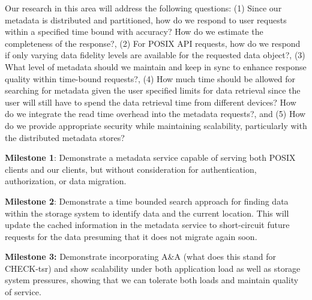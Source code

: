 Our research in this area will address the following questions:
(1) Since our metadata is distributed and partitioned, how do we respond to user
  requests within a specified time bound with accuracy? How do we estimate the
  completeness of the response?, 
(2) For POSIX API requests, how do we respond if only varying data fidelity
  levels are available for the requested data object?, 
(3) What level of metadata should we maintain and keep in sync to enhance
  response quality within time-bound requests?, 
(4) How much time should be allowed for searching for metadata given the user
  specified limits for data retrieval since the user will still have to spend
  the data retrieval time from different devices? How do we integrate the read
  time overhead into the metadata requests?, and
(5) How do we provide appropriate security while maintaining scalability,
  particularly with the distributed metadata stores?

\begin{tightEnumerate}

\item {\bf Milestone 1}: Demonstrate a metadata service capable of serving both POSIX
clients and our clients, but without consideration for authentication,
authorization, or data migration.

\item {\bf Milestone 2}: Demonstrate a time bounded search approach for finding data
within the storage system to identify data and the current location.  This will
update the cached information in the metadata service to short-circuit future
requests for the data presuming that it does not migrate again soon.

\item {\bf Milestone 3:} Demonstrate incorporating {\color{red}A\&A (what does this stand for CHECK-tsr)} and show scalability under
both application load as well as storage system pressures, showing that we can
tolerate both loads and maintain quality of service.

\end{tightEnumerate}

